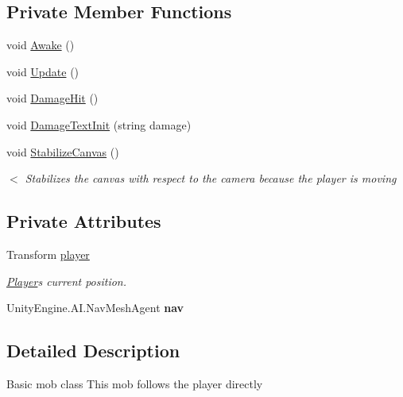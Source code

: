 \subsection*{Private Member Functions}
\begin{DoxyCompactItemize}
\item 
void \hyperlink{class_mob1_movement_ab5d6209e3082865eb69e197997e7c8f7}{Awake} ()
\item 
void \hyperlink{class_mob1_movement_a788bc296f79b07051e91a3c1d1613bc9}{Update} ()
\item 
void \hyperlink{class_mob1_movement_a208b9f2f72d057c44055af58371bdfd1}{Damage\+Hit} ()
\item 
void \hyperlink{class_mob1_movement_a8c36ef4e56bc37704d47635c444a07c6}{Damage\+Text\+Init} (string damage)
\item 
void \hyperlink{class_mob1_movement_a77cf67d8073a810fd269199883b485b6}{Stabilize\+Canvas} ()
\begin{DoxyCompactList}\small\item\em $<$ Stabilizes the canvas with respect to the camera because the player is moving \end{DoxyCompactList}\end{DoxyCompactItemize}
\subsection*{Private Attributes}
\begin{DoxyCompactItemize}
\item 
\mbox{\label{class_mob1_movement_a7d4076faee2feead1c09d2a670aa24c5}} 
Transform \hyperlink{class_mob1_movement_a7d4076faee2feead1c09d2a670aa24c5}{player}
\begin{DoxyCompactList}\small\item\em \hyperlink{class_player}{Player}\textquotesingle{}s current position. \end{DoxyCompactList}\item 
\mbox{\label{class_mob1_movement_a48a34641232183ed3da4641f82dd4f20}} 
Unity\+Engine.\+A\+I.\+Nav\+Mesh\+Agent {\bfseries nav}
\end{DoxyCompactItemize}


\subsection{Detailed Description}
Basic mob class This mob follows the player directly 

